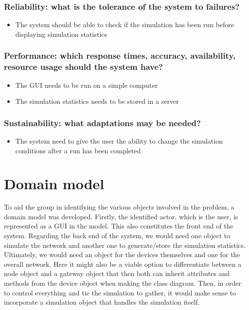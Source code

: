 \subsubsection{Reliability: what is the tolerance of the system to failures?}
\begin{itemize}
  \item The system should be able to check if the simulation has been run before displaying simulation statistics
\end{itemize}

\subsubsection{Performance: which response times, accuracy, availability, resource usage should the system have?}

\begin{itemize}
  \item The GUI needs to be run on a simple computer
  \item The simulation statistics needs to be stored in a server
\end{itemize}

\subsubsection{Sustainability: what adaptations may be needed?}
\begin{itemize}
  \item The system need to give the user the ability to change the simulation conditions after a run has been completed
\end{itemize}

\section{Domain model}
To aid the group in identifying the various objects involved in the problem, a domain model was developed. Firstly, the identified actor, which is the user, is represented as a GUI in the model. This also constitutes the front end of the system. Regarding the back end of the system, we would need one object to simulate the network and another one to generate/store the simulation statistics. Ultimately, we would need an object for the devices themselves and one for the overall network. Here it might also be a viable option to differentiate between a node object and a gateway object that then both can inherit attributes and methods from the device object when making the class diagram. Then, in order to control everything and tie the simulation to gather, it would make sense to incorporate a simulation object that handles the simulation itself.

